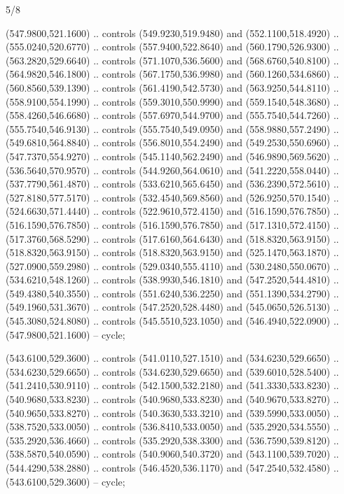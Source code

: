 \begin{flagdescription}{5/8}
\begin{scope}[shift={(m)}]
\begin{scope}[scale=\flagwidth/220,y=0.1mm, x=0.1mm, yscale=-1,shift={(-596,-360)}]
\begin{scope}[draw=black,line join=round,line cap=round,line width=0.381\lw]
\begin{scope}[line width=0.534\lw,fill=green]
 (547.9800,521.1600) .. controls (549.9230,519.9480) and
  (552.1100,518.4920) .. (555.0240,520.6770) .. controls (557.9400,522.8640) and
  (560.1790,526.9300) .. (563.2820,529.6640) .. controls (571.1070,536.5600) and
  (568.6760,540.8100) .. (564.9820,546.1800) .. controls (567.1750,536.9980) and
  (560.1260,534.6860) .. (560.8560,539.1390) .. controls (561.4190,542.5730) and
  (563.9250,544.8110) .. (558.9100,554.1990) .. controls (559.3010,550.9990) and
  (559.1540,548.3680) .. (558.4260,546.6680) .. controls (557.6970,544.9700) and
  (555.7540,544.7260) .. (555.7540,546.9130) .. controls (555.7540,549.0950) and
  (558.9880,557.2490) .. (549.6810,564.8840) .. controls (556.8010,554.2490) and
  (549.2530,550.6960) .. (547.7370,554.9270) .. controls (545.1140,562.2490) and
  (546.9890,569.5620) .. (536.5640,570.9570) .. controls (544.9260,564.0610) and
  (541.2220,558.0440) .. (537.7790,561.4870) .. controls (533.6210,565.6450) and
  (536.2390,572.5610) .. (527.8180,577.5170) .. controls (532.4540,569.8560) and
  (526.9250,570.1540) .. (524.6630,571.4440) .. controls (522.9610,572.4150) and
  (516.1590,576.7850) .. (516.1590,576.7850) .. controls (516.1590,576.7850) and
  (517.1310,572.4150) .. (517.3760,568.5290) .. controls (517.6160,564.6430) and
  (518.8320,563.9150) .. (518.8320,563.9150) .. controls (518.8320,563.9150) and
  (525.1470,563.1870) .. (527.0900,559.2980) .. controls (529.0340,555.4110) and
  (530.2480,550.0670) .. (534.6210,548.1260) .. controls (538.9930,546.1810) and
  (547.2520,544.4810) .. (549.4380,540.3550) .. controls (551.6240,536.2250) and
  (551.1390,534.2790) .. (549.1960,531.3670) .. controls (547.2520,528.4480) and
  (545.0650,526.5130) .. (545.3080,524.8080) .. controls (545.5510,523.1050) and
  (546.4940,522.0900) .. (547.9800,521.1600) -- cycle;

 (543.6100,529.3600) .. controls (541.0110,527.1510) and
  (534.6230,529.6650) .. (534.6230,529.6650) .. controls (534.6230,529.6650) and
  (539.6010,528.5400) .. (541.2410,530.9110) .. controls (542.1500,532.2180) and
  (541.3330,533.8230) .. (540.9680,533.8230) .. controls (540.9680,533.8230) and
  (540.9670,533.8270) .. (540.9650,533.8270) .. controls (540.3630,533.3210) and
  (539.5990,533.0050) .. (538.7520,533.0050) .. controls (536.8410,533.0050) and
  (535.2920,534.5550) .. (535.2920,536.4660) .. controls (535.2920,538.3300) and
  (536.7590,539.8120) .. (538.5870,540.0590) .. controls (540.9060,540.3720) and
  (543.1100,539.7020) .. (544.4290,538.2880) .. controls (546.4520,536.1170) and
  (547.2540,532.4580) .. (543.6100,529.3600) -- cycle;


\end{scope}
\end{scope}
\end{scope}
\end{scope}
\end{flagdescription}
